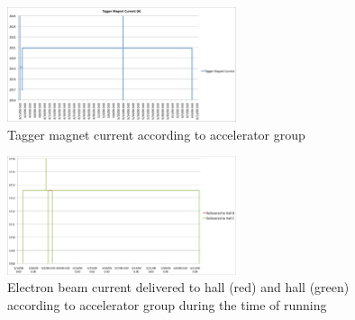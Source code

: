 \begin{figure}\begin{center}
\includegraphics[width=0.6\textwidth]{figures/calib/tag/ecor/tagger_current_arne.eps}
\caption[Current of Tagger Magnet from Accelerator Group]{\label{fig:tag.magnet.arne} Tagger magnet current according to accelerator group}
\end{center}\end{figure}

\begin{figure}\begin{center}
\includegraphics[width=0.6\textwidth]{figures/calib/tag/ecor/beam_currentsII.eps}
\caption[Electron Beam Current Delivered to hall  and hall  ]{\label{fig:beamcurrents}Electron beam current delivered to hall (red) and hall  (green) according to accelerator group during the time of  running }
\end{center}\end{figure}


